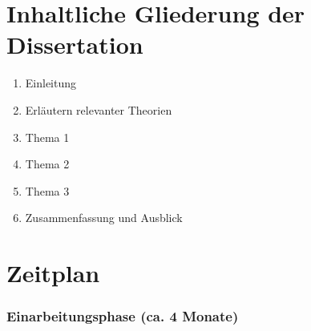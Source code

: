 \documentclass[a4paper,bibliography=totocnumbered,12pt]{article}
\begin{document}
\section{Inhaltliche Gliederung der Dissertation}
\begin{enumerate}
	\item Einleitung
	\item Erläutern relevanter Theorien
	\item Thema 1
	\item Thema 2
	\item Thema 3
	\item Zusammenfassung und Ausblick
\end{enumerate}
\clearpage


\section{Zeitplan}

\subsubsection*{Einarbeitungsphase (ca. 4 Monate)}
\end{document}
